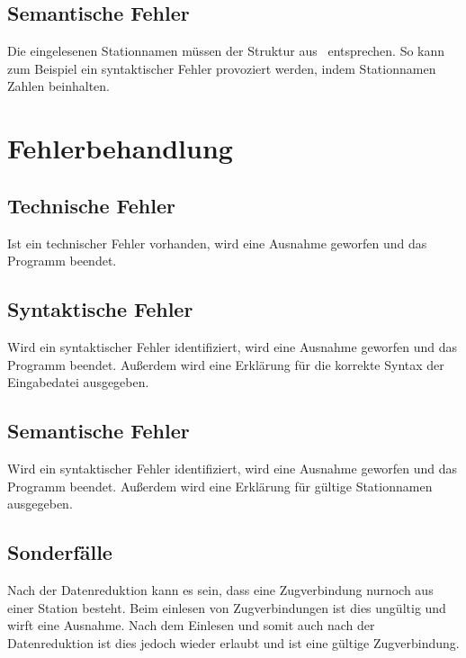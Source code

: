 \subsection{Semantische Fehler}\label{auf:subsec:semantische-fehler}
Die eingelesenen Stationnamen müssen der Struktur aus~ entsprechen.
So kann zum Beispiel ein syntaktischer Fehler provoziert werden, indem Stationnamen Zahlen beinhalten.

\section{Fehlerbehandlung}\label{auf:sec:fehlerbehandlung}

\subsection{Technische Fehler}\label{auf:subsec:technische-fehler-behandlung}
Ist ein technischer Fehler vorhanden, wird eine Ausnahme geworfen und das Programm beendet.


\subsection{Syntaktische Fehler}\label{auf:subsec:syntaktische-fehler-behandlung}
Wird ein syntaktischer Fehler identifiziert, wird eine Ausnahme geworfen und das Programm beendet. Außerdem wird eine Erklärung für die korrekte Syntax der Eingabedatei ausgegeben.

\subsection{Semantische Fehler}\label{auf:subsec:semantische-fehler-behandlung}
Wird ein syntaktischer Fehler identifiziert, wird eine Ausnahme geworfen und das Programm beendet. Außerdem wird eine Erklärung für gültige Stationnamen ausgegeben.


\subsection{Sonderfälle}\label{auf:subsec:sonderfaelle}
Nach der Datenreduktion kann es sein, dass eine Zugverbindung nurnoch aus einer Station besteht. Beim einlesen von Zugverbindungen ist dies ungültig und wirft eine Ausnahme. Nach dem Einlesen und somit auch nach der Datenreduktion ist dies jedoch wieder erlaubt und ist eine gültige Zugverbindung.\\
